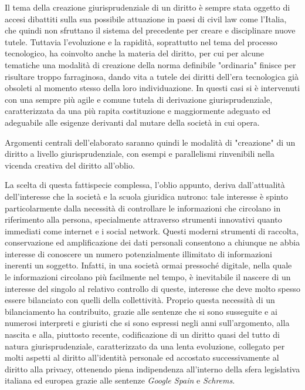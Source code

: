 Il tema della creazione giurisprudenziale di un diritto è sempre stata oggetto di accesi dibattiti sulla sua possibile attuazione in paesi di civil law come l'Italia, che quindi non sfruttano il sistema del precedente per creare e disciplinare nuove tutele. Tuttavia l'evoluzione e la rapidità, soprattutto nel tema del processo tecnologico, ha coinvolto anche la materia del diritto, per cui per alcune tematiche una modalità di creazione della norma definibile "ordinaria" finisce per risultare troppo farraginosa, dando vita a tutele dei diritti dell'era tecnologica già obsoleti al momento stesso della loro individuazione. In questi casi si è intervenuti con una sempre più agile e comune tutela di derivazione giurisprudenziale, caratterizzata da una più rapita costituzione e maggiormente adeguato ed adeguabile alle esigenze derivanti dal mutare della società in cui opera.

Argomenti centrali dell'elaborato saranno quindi le modalità di "creazione" di un diritto a livello giurisprudenziale, con esempi e parallelismi rinvenibili nella vicenda creativa del diritto all'oblio.

La scelta di questa fattispecie complessa, l'oblio appunto, deriva dall'attualità dell'interesse che la società e la scuola giuridica nutrono: tale interesse è spinto particolarmente dalla necessità di controllare le informazioni che circolano in riferimento alla persona, specialmente attraverso strumenti innovativi quanto immediati come internet e i social network.
Questi moderni strumenti di raccolta, conservazione ed amplificazione dei dati personali consentono a chiunque ne abbia interesse di conoscere un numero potenzialmente illimitato di informazioni inerenti un soggetto.
Infatti, in una società ormai pressoché digitale, nella quale le informazioni circolano più facilmente nel tempo, è inevitabile il nascere di un interesse del singolo al relativo controllo di queste, interesse che deve molto spesso essere bilanciato con quelli della collettività.
Proprio questa necessità di un bilanciamento ha contribuito, grazie alle sentenze che si sono susseguite e ai numerosi interpreti e giuristi che si sono espressi negli anni sull'argomento, alla nascita e alla, piuttosto recente, codificazione di un diritto quasi del tutto di natura giurisprudenziale, caratterizzato da una lenta evoluzione, collegato per molti aspetti al diritto all'identità personale ed accostato successivamente al diritto alla privacy, ottenendo piena indipendenza all'interno della sfera legislativa italiana ed europea grazie alle sentenze \textit{Google Spain} e \textit{Schrems}.

